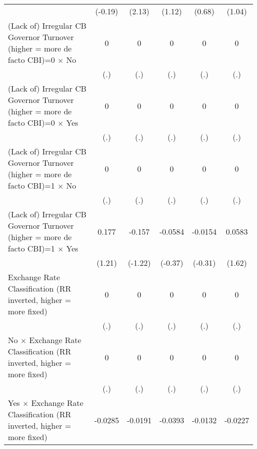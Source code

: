 {\begin{tabular*}{\linewidth}{@{\hskip\tabcolsep\extracolsep\fill}l*{5}{c}}
                &  (-0.19)         &   (2.13)         &   (1.12)         &   (0.68)         &   (1.04)         \\
\addlinespace
(Lack of) Irregular CB Governor Turnover (higher = more de facto CBI)=0 $\times$ No&        0         &        0         &        0         &        0         &        0         \\
                &      (.)         &      (.)         &      (.)         &      (.)         &      (.)         \\
\addlinespace
(Lack of) Irregular CB Governor Turnover (higher = more de facto CBI)=0 $\times$ Yes&        0         &        0         &        0         &        0         &        0         \\
                &      (.)         &      (.)         &      (.)         &      (.)         &      (.)         \\
\addlinespace
(Lack of) Irregular CB Governor Turnover (higher = more de facto CBI)=1 $\times$ No&        0         &        0         &        0         &        0         &        0         \\
                &      (.)         &      (.)         &      (.)         &      (.)         &      (.)         \\
\addlinespace
(Lack of) Irregular CB Governor Turnover (higher = more de facto CBI)=1 $\times$ Yes&    0.177         &   -0.157         &  -0.0584         &  -0.0154         &   0.0583         \\
                &   (1.21)         &  (-1.22)         &  (-0.37)         &  (-0.31)         &   (1.62)         \\
\addlinespace
Exchange Rate Classification (RR inverted, higher = more fixed)&        0         &        0         &        0         &        0         &        0         \\
                &      (.)         &      (.)         &      (.)         &      (.)         &      (.)         \\
\addlinespace
No $\times$ Exchange Rate Classification (RR inverted, higher = more fixed)&        0         &        0         &        0         &        0         &        0         \\
                &      (.)         &      (.)         &      (.)         &      (.)         &      (.)         \\
\addlinespace
Yes $\times$ Exchange Rate Classification (RR inverted, higher = more fixed)&  -0.0285\sym{*}  &  -0.0191         &  -0.0393\sym{*}  &  -0.0132         &  -0.0227\sym{**} \\

\end{tabular*}}

